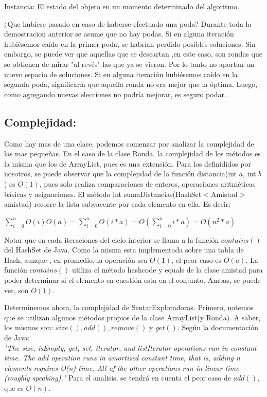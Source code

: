 \documentclass[10pt, a4paper]{article}
\begin{document}
Instancia: El estado del objeto en un momento determinado del algoritmo.

¿Que hubiese pasado en caso de haberse efectuado una poda?
Durante toda la demostracion anterior se asume que no hay podas.
Si en alguna iteración hubiésemos caído en la primer poda, se habrían perdido posibles soluciones. Sin embargo, se puede ver que aquellas que se descartan ,en este caso, son rondas que se obtienen de mirar "al revés" las que ya se vieron. Por lo tanto no aportan un nuevo espacio de soluciones.
Si en alguna iteración hubiésemos caído en la segunda poda, significaría que aquella ronda no era mejor que la óptima. Luego, como agregando nuevas elecciones no podría mejorar, es seguro podar.


\subsection{Complejidad:}

Como hay mas de una clase, podemos comenzar por analizar la complejidad de las mas pequeñas.
En el caso de la clase Ronda, la complejidad de los métodos es la misma que los de ArrayList, pues es una extensión. 
Para los definididos por nosotros, se puede observar que la complejidad de la función distancia(int $a$, int $b$) es $O(1)$, pues solo realiza comparaciones de enteros, operaciones aritméticas básicas y asignaciones.
El método  int  sumaDistancias(HashSet$<$Amistad$>$ amistad) recorre la lista subyacente por cada elemento en ella. Es decir:

\hspace{30mm}$\sum\limits_{i=0}^n O(i)O(a) =  \sum\limits_{i=0}^n O(i*a) = O(\sum\limits_{i=0}^n i*a) = O(n^2*a)$ 

Notar que en cada iteraciones del ciclo interior se llama a la función $contains()$ del HashSet de Java. Como la misma esta implementada sobre una tabla de Hash, aunque , en promedio, la operación sea $O(1)$, el peor caso es $O(a)$. La función $contains()$ utiliza el método hashcode y equals de la clase amistad para poder determinar si el elemento en cuestión esta en el conjunto. Ambas, se puede ver, son $O(1)$.


Determinemos ahora, la complejidad de SentarExploradoras.
Primero, notemos que se utilizan algunos métodos propios de la clase ArrayList(y Ronda). A saber, los mismos son: $size(),add(),remove()$ y $get()$. Según la documentación de Java:\\

\textit{"The size, isEmpty, get, set, iterator, and listIterator operations run in constant time. The add operation runs in amortized constant time, that is, adding n elements requires O(n) time. All of the other operations run in linear time (roughly speaking)."} Para el analisis, se tendrá en cuenta el peor caso de $add()$, que es $O(n)$.
\end{document}
